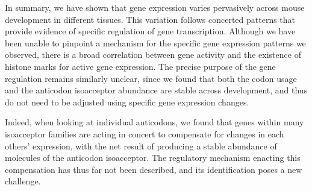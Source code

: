 \parrule

In summary, we have shown that \trna gene expression varies pervasively across
mouse development in different tissues. This variation follows concerted
patterns that provide evidence of specific regulation of \trna gene
transcription. Although we have been unable to pinpoint a mechanism for the
specific gene expression patterns  we observed, there is a broad correlation
between \trna gene activity and the existence of histone marks for active gene
expression. The precise purpose of the \trna gene regulation remains similarly
unclear, since we found that both the codon usage and the anticodon isoacceptor
abundance are stable across development, and thus do not need to be adjusted
using specific \trna gene expression changes.

Indeed, when looking at individual anticodons, we found that \trna genes within
many isoacceptor families are acting in concert to compensate for changes in
each others’ expression, with the net result of producing a stable abundance of
\trna molecules of the anticodon isoacceptor. The regulatory mechanism enacting
this compensation has thus far not been described, and its identification poses
a new challenge.

